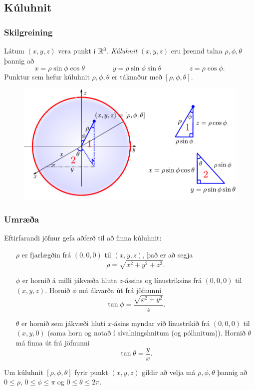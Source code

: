 \subsection{Kúluhnit} 

\subsubsection{Skilgreining }
 Látum $(x,y,z)$ vera punkt í ${\mathbb R}^3$.  {\em Kúluhnit} $(x,y,z)$ eru þrennd talna $\rho, \phi, \theta$ þannig að 
$$x=\rho\sin\phi\cos\theta\qquad\qquad y=\rho\sin\phi\sin\theta\qquad\qquad z=\rho\cos\phi.$$
Punktur sem hefur kúluhnit $\rho, \phi, \theta$ er táknaður 
með $[\rho, \phi, \theta]$. 

\begin {figure}[h!]
 \centering
            \includegraphics[width=0.75\linewidth]{sphere}
            \caption*{}
\end {figure}



\subsubsection{Umræða }
Eftirfarandi jöfnur gefa aðferð til að finna kúluhnit:
\begin{itemize}
\item[$\rho$]  er fjarlægðin frá $(0,0,0)$ til $(x,y,z)$, það er að segja 
$$\rho=\sqrt{x^2+y^2+z^2}.$$
\item[$\phi$] er hornið á milli jákvæða hluta $z$-ássins og línustriksins frá $(0,0,0)$ til $(x,y,z)$.  Hornið $\phi$ má ákvarða út frá jöfnunni
$$\tan\phi=\frac{\sqrt{x^2+y^2}}{z}.$$
\item[$\theta$] er hornið sem jákvæði hluti $x$-ásins myndar við línustrikið frá $(0,0,0)$ til $(x,y,0)$ (sama horn og notað í sívalningshnitum (og pólhnitum)).   Hornið $\theta$ má finna út frá jöfnunni
$$\tan\theta=\frac{y}{x}.$$
\end{itemize}
Um kúluhnit $[\rho, \phi, \theta]$ fyrir punkt $(x,y,z)$ gildir að 
velja má $\rho, \phi, \theta$ þannig að
$0\leq \rho$, $0\leq\phi\leq \pi$ og $0\leq\theta\leq 2\pi$.




